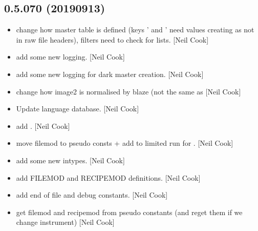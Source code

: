 \documentclass[a4paper,10pt,english]{report}
\begin{document}
\subsection{0.5.070 (2019\sphinxhyphen{}09\sphinxhyphen{}13)}
\label{\detokenize{misc/changelog:id92}}\begin{itemize}
\item {} 
 \sphinxhyphen{} change how master table is defined (keys
’ and ’ need values creating as not in raw
file headers), filters need to check for lists. {[}Neil Cook{]}

\item {} 
 \sphinxhyphen{} add some new logging. {[}Neil Cook{]}

\item {} 
 \sphinxhyphen{} add some new logging for dark master creation.
{[}Neil Cook{]}

\item {} 
 \sphinxhyphen{} change how image2 is
normalised by blaze (not the same as  {[}Neil Cook{]}

\item {} 
Update language database. {[}Neil Cook{]}

\item {} 
 \sphinxhyphen{} add . {[}Neil Cook{]}

\item {} 
 \sphinxhyphen{} move filemod to pseudo
consts + add  to limited run for . {[}Neil
Cook{]}

\item {} 
 \sphinxhyphen{} add some new intypes. {[}Neil Cook{]}

\item {} 
 \sphinxhyphen{} add FILEMOD and RECIPEMOD
definitions. {[}Neil Cook{]}

\item {} 
 \sphinxhyphen{} add end of file and debug constants.
{[}Neil Cook{]}

\item {} 
 \sphinxhyphen{} get filemod and recipemod from pseudo
constants (and re\sphinxhyphen{}get them if we change instrument) {[}Neil Cook{]}


\end{itemize}
\end{document}
